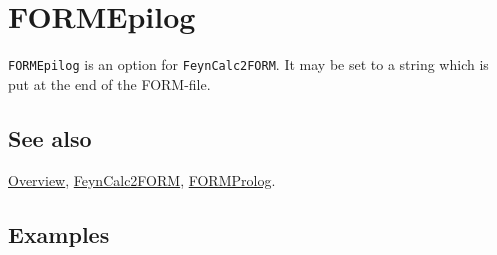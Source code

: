 \documentclass[../FeynCalcManual.tex]{subfiles}
\begin{document}
\hypertarget{formepilog}{
\section{FORMEpilog}\label{formepilog}}

\texttt{FORMEpilog} is an option for \texttt{FeynCalc2FORM}. It may be
set to a string which is put at the end of the FORM-file.

\subsection{See also}

\hyperlink{toc}{Overview}, \hyperlink{feyncalc2form}{FeynCalc2FORM},
\hyperlink{formprolog}{FORMProlog}.

\subsection{Examples}
\end{document}

